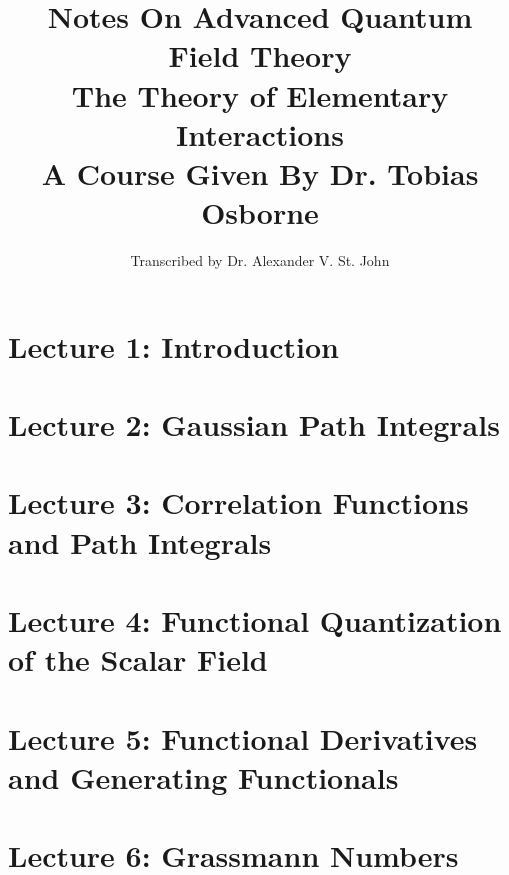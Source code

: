 \documentclass[10pt]{article}
\title{Notes On Advanced Quantum Field Theory \\ The Theory of Elementary Interactions \\ A Course Given By Dr. Tobias Osborne}
\author{Transcribed by Dr. Alexander V. St. John}
\begin{document}
\maketitle

\clearpage

\section*{Lecture 1: Introduction}
\label{sec: lec1}



\clearpage

\section*{Lecture 2: Gaussian Path Integrals}
\label{sec: lec2}



\clearpage

\section*{Lecture 3: Correlation Functions and Path Integrals}
\label{sec: lec3}



\clearpage

\section*{Lecture 4: Functional Quantization of the Scalar Field}
\label{sec: lec4}



\clearpage

\section*{Lecture 5: Functional Derivatives and Generating Functionals}
\label{sec: lec5}



\clearpage

\section*{Lecture 6: Grassmann Numbers}
\label{sec: lec6}



\clearpage
\end{document}

